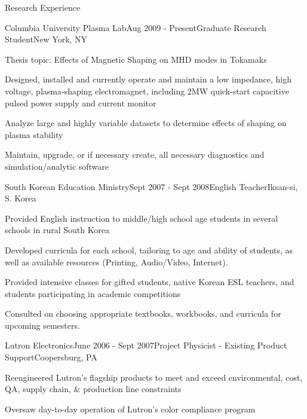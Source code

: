 \documentclass{resume} %
\begin{document}
\begin{rSection}{Research Experience}

\begin{rSubsection}{Columbia University Plasma Lab}{Aug 2009 - Present}{Graduate Research Student}{New York, NY}
\item	Thesis topic: Effects of Magnetic Shaping on MHD modes in Tokamaks 
\item	Designed, installed and currently operate and maintain a low impedance, high voltage, plasma-shaping electromagnet, including 2MW quick-start capacitive pulsed power supply and current monitor
\item	Analyze large and highly variable datasets to determine effects of shaping on plasma stability
\item   Maintain, upgrade, or if necessary create, all necessary diagnostics and simulation/analytic software

\end{rSubsection}


\begin{rSubsection}{South Korean Education Ministry}{Sept 2007 - Sept 2008}{English Teacher}{Iksan-si, S. Korea }
\item Provided English instruction to middle/high school age students in several schools in rural South Korea
\item Developed curricula for each school, tailoring to age and ability of students, as well as available resources (Printing, Audio/Video, Internet).
\item Provided intensive classes for gifted students, native Korean ESL teachers, and students participating in academic competitions
\item Consulted on choosing appropriate textbooks, workbooks, and curricula for upcoming semesters.
\end{rSubsection}


\begin{rSubsection}{Lutron Electronics}{June 2006 - Sept 2007}{Project Physicist - Existing Product Support}{Coopersburg, PA}
\item	Reengineered Lutron's flagship products to meet and exceed environmental, cost, QA, supply chain, \& production line constraints
\item	Oversaw day-to-day operation of Lutron’s color compliance program


\end{rSubsection}
\end{rSection}
\end{document}
